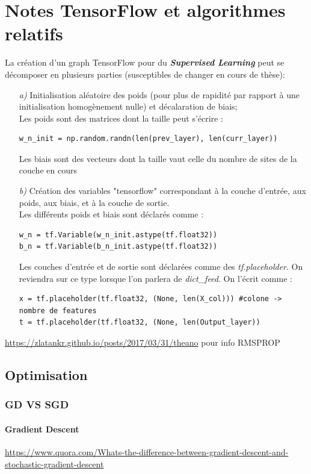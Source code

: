 \documentclass[a4paper,12pt]{report}
\newcommand\bk{\color{black}}
\newcommand\brick{\color{brick}}
\newcommand\navy{\color{navy}}
\numberwithin{equation}{section} %
\begin{document}
\navy \chapter{Notes TensorFlow et algorithmes relatifs} \bk
La création d'un graph TensorFlow pour du \textit{\textbf{Supervised Learning}} peut se décomposer en plusieurs parties (susceptibles de changer en cours de thèse):
\begin{itemize}
\item[\textit{a) }] Initialisation aléatoire des poids (pour plus de rapidité par rapport à une initialisation homogènement nulle) et décalaration de biais; \\
Les poids sont des matrices dont la taille peut s'écrire : 
\begin{lstlisting}
w_n_init = np.random.randn(len(prev_layer), len(curr_layer))
\end{lstlisting}
Les biais sont des vecteurs dont la taille vaut celle du nombre de sites de la couche en cours
\item[\textit{b) }] Création des variables "tensorflow" correspondant à la couche d'entrée, aux poids, aux biais, et à la couche de sortie.\\
Les différents poids et biais sont déclarés comme :
\begin{lstlisting}
w_n = tf.Variable(w_n_init.astype(tf.float32))
b_n = tf.Variable(b_n_init.astype(tf.float32))
\end{lstlisting}
Les couches d'entrée et de sortie sont déclarées comme des \textit{tf.placeholder}. On reviendra sur ce type lorsque l'on parlera de \textit{dict\_feed}. On l'écrit comme :
\begin{lstlisting}
x = tf.placeholder(tf.float32, (None, len(X_col))) #colone -> nombre de features
t = tf.placeholder(tf.float32, (None, len(Output_layer))
\end{lstlisting} 
\end{itemize}

\url{https://zlatankr.github.io/posts/2017/03/31/theano} pour info RMSPROP
\pagebreak 
\section{Optimisation}
\brick \subsection{GD VS SGD} \bk
\subsubsection*{Gradient Descent}
\noindent \footnotesize{\url{https://www.quora.com/Whats-the-difference-between-gradient-descent-and-stochastic-gradient-descent} } \normalsize
\end{document}
